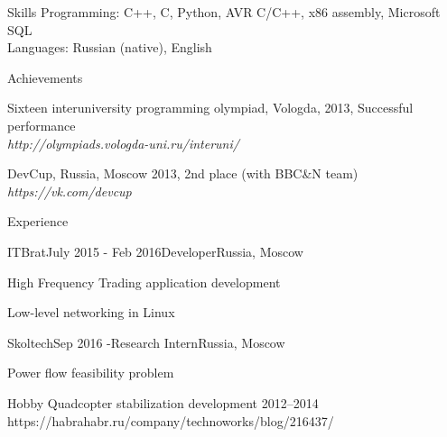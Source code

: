 \documentclass{resume} %
\begin{document}
\begin{rSection}{Skills}
Programming: C++, C, Python, AVR C/C++, x86 assembly, Microsoft SQL\\
Languages: Russian (native), English
\end{rSection}


\begin{rSection}{Achievements}
\item Sixteen interuniversity programming olympiad, Vologda, 2013, Successful performance \\
\hfill {\em http://olympiads.vologda-uni.ru/interuni/}
\item DevCup, Russia, Moscow 2013, 2nd place (with BBC\&N team)\\
\hfill {\em https://vk.com/devcup}
\end{rSection}


\begin{rSection}{Experience}
	
	
	
	\begin{rSubsection}{ITBrat}{July 2015 - Feb 2016}{Developer}{Russia, Moscow}
		\item High Frequency Trading application development
		\item Low-level networking in Linux
	\end{rSubsection}
\newpage
	\begin{rSubsection}{Skoltech}{Sep 2016 -}{Research Intern}{Russia, Moscow}
		\item Power flow feasibility problem
	\end{rSubsection}
	
	
\end{rSection}

\begin{rSection}{Hobby}
	Quadcopter stabilization development 2012--2014\\
	https://habrahabr.ru/company/technoworks/blog/216437/
\end{rSection}

\end{document}
